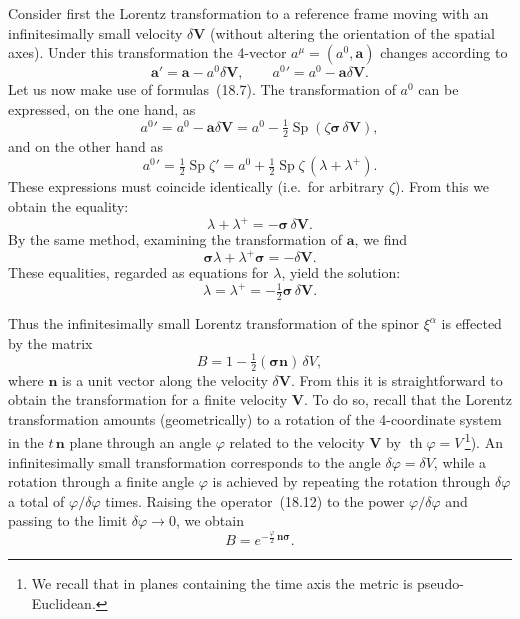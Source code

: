 Consider first the Lorentz transformation to a reference frame moving with an infinitesimally small velocity $\delta\mathbf{V}$ (without altering the orientation of the spatial axes). Under this transformation the 4-vector $a^\mu = (a^0, \mathbf{a})$ changes according to
\begin{equation}
\mathbf{a}' = \mathbf{a} - a^0\delta\mathbf{V},\qquad {a^0}' = a^0 - \mathbf{a}\delta\mathbf{V}.
\tag{18.11}
\end{equation}
Let us now make use of formulas~(18.7). The transformation of $a^0$ can be expressed, on the one hand, as
\[
{a^0}' = a^0 - \mathbf{a}\delta\mathbf{V} = a^0 - \tfrac{1}{2}\operatorname{Sp}(\zeta\boldsymbol{\sigma}\,\delta\mathbf{V}),
\]
and on the other hand as
\[
{a^0}' = \tfrac{1}{2}\operatorname{Sp}\zeta' = a^0 + \tfrac{1}{2}\operatorname{Sp}\zeta\,(\lambda + \lambda^+).
\]
These expressions must coincide identically (i.e.\ for arbitrary $\zeta$). From this we obtain the equality:
\[
\lambda + \lambda^+ = -\boldsymbol{\sigma}\,\delta\mathbf{V}.
\]
By the same method, examining the transformation of $\mathbf{a}$, we find
\[
\boldsymbol{\sigma}\lambda + \lambda^+\boldsymbol{\sigma} = -\delta\mathbf{V}.
\]
These equalities, regarded as equations for $\lambda$, yield the solution:
\[
\lambda = \lambda^+ = -\tfrac{1}{2}\boldsymbol{\sigma}\,\delta\mathbf{V}.
\]

Thus the infinitesimally small Lorentz transformation of the spinor $\xi^\alpha$ is effected by the matrix
\begin{equation}
B = 1 - \tfrac{1}{2}(\boldsymbol{\sigma}\mathbf{n})\,\delta V,
\tag{18.12}
\end{equation}
where $\mathbf{n}$ is a unit vector along the velocity $\delta\mathbf{V}$. From this it is straightforward to obtain the transformation for a finite velocity $\mathbf{V}$. To do so, recall that the Lorentz transformation amounts (geometrically) to a rotation of the 4-coordinate system in the $t\,\mathbf{n}$ plane through an angle $\varphi$ related to the velocity $\mathbf{V}$ by $\operatorname{th}\varphi = V$\,\footnote{We recall that in planes containing the time axis the metric is pseudo-Euclidean.}). An infinitesimally small transformation corresponds to the angle $\delta\varphi = \delta V$, while a rotation through a finite angle $\varphi$ is achieved by repeating the rotation through $\delta\varphi$ a total of $\varphi/\delta\varphi$ times. Raising the operator~(18.12) to the power $\varphi/\delta\varphi$ and passing to the limit $\delta\varphi \to 0$, we obtain
\begin{equation}
B = e^{-\frac{\varphi}{2}\,\mathbf{n}\boldsymbol{\sigma}}.
\tag{18.13}
\end{equation}

